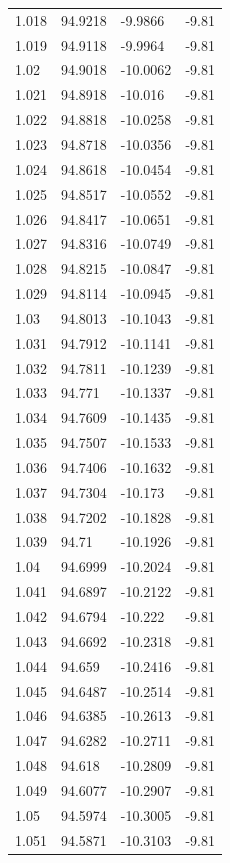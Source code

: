 \begin{tabular}{llll}
1.018 & 94.9218 & -9.9866 & -9.81 \\
1.019 & 94.9118 & -9.9964 & -9.81 \\
1.02 & 94.9018 & -10.0062 & -9.81 \\
1.021 & 94.8918 & -10.016 & -9.81 \\
1.022 & 94.8818 & -10.0258 & -9.81 \\
1.023 & 94.8718 & -10.0356 & -9.81 \\
1.024 & 94.8618 & -10.0454 & -9.81 \\
1.025 & 94.8517 & -10.0552 & -9.81 \\
1.026 & 94.8417 & -10.0651 & -9.81 \\
1.027 & 94.8316 & -10.0749 & -9.81 \\
1.028 & 94.8215 & -10.0847 & -9.81 \\
1.029 & 94.8114 & -10.0945 & -9.81 \\
1.03 & 94.8013 & -10.1043 & -9.81 \\
1.031 & 94.7912 & -10.1141 & -9.81 \\
1.032 & 94.7811 & -10.1239 & -9.81 \\
1.033 & 94.771 & -10.1337 & -9.81 \\
1.034 & 94.7609 & -10.1435 & -9.81 \\
1.035 & 94.7507 & -10.1533 & -9.81 \\
1.036 & 94.7406 & -10.1632 & -9.81 \\
1.037 & 94.7304 & -10.173 & -9.81 \\
1.038 & 94.7202 & -10.1828 & -9.81 \\
1.039 & 94.71 & -10.1926 & -9.81 \\
1.04 & 94.6999 & -10.2024 & -9.81 \\
1.041 & 94.6897 & -10.2122 & -9.81 \\
1.042 & 94.6794 & -10.222 & -9.81 \\
1.043 & 94.6692 & -10.2318 & -9.81 \\
1.044 & 94.659 & -10.2416 & -9.81 \\
1.045 & 94.6487 & -10.2514 & -9.81 \\
1.046 & 94.6385 & -10.2613 & -9.81 \\
1.047 & 94.6282 & -10.2711 & -9.81 \\
1.048 & 94.618 & -10.2809 & -9.81 \\
1.049 & 94.6077 & -10.2907 & -9.81 \\
1.05 & 94.5974 & -10.3005 & -9.81 \\
1.051 & 94.5871 & -10.3103 & -9.81 \\

\end{tabular}
